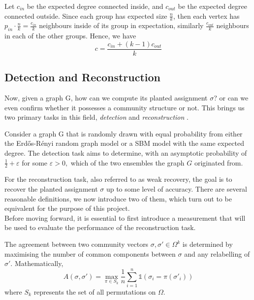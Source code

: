 Let $c_{in}$ be the expected degree connected inside, and $c_{out}$ be the expected degree connected outside. Since each group has expected size $\frac{n}{k}$, then each vertex has $p_{in}\cdot \frac{n}{k}=\frac{c_{in}}{k}$ neighbours inside of its group in expectation, similarly $\frac{c_{out}}{k}$ neighbours in each of the other groups. Hence, we have\begin{equation}
    c=\frac{c_{in}+(k-1)c_{out}}{k}
\end{equation}

\subsection{Detection and Reconstruction}
Now, given a graph G, how can we compute its planted assignment $\sigma$? or  can we even confirm whether it possesses a community structure or not. This brings us two primary tasks in this field, \textit{detection} and \textit{reconstruction} \cite{TheConjecture}\cite{TheSurvey}.
\begin{definition}
    Consider a graph G that is randomly drawn with equal probability from either the Erd\H{o}s-R\'{e}nyi random graph model or a SBM model with the same expected degree. The detection task aims to determine, with an asymptotic probability of $\frac{1}{2}+\varepsilon$ for some $\varepsilon > 0,$ which of the two ensembles the graph $G$ originated from.
\end{definition}
For the reconstruction task, also referred to as weak recovery, the goal is to recover the planted assignment $\sigma$ up to some level of accuracy. There are several reasonable definitions, we now introduce two of them, which turn out to be equivalent for the purpose of this project.\\
Before moving forward, it is essential to first introduce a measurement that will be used to evaluate the performance of the reconstruction task.
\begin{definition}
The agreement between two community vectors $\sigma, \sigma'\in\Omega^k$ is determined by maximising the number of common components between $\sigma$ and any relabelling of $\sigma'.$ Mathematically, \begin{equation}
    A(\sigma, \sigma')=\max_{\pi \in S_k} \frac{1}{n} \sum_{i=1}^{n} \mathbb{1}(\sigma_i = \pi(\sigma'_i))
\end{equation}
where $S_k$ represents the set of all permutations on $\Omega$.
\end{definition}
